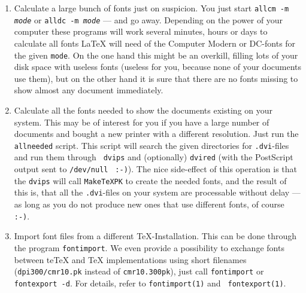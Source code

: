 \documentclass[12pt,a4paper]{article}
\newcommand{\teTeX}{\textrm{te}\TeX\xspace}
\newcommand{\smiley}{\texttt{ :-)}\xspace}
\begin{document}
\begin{enumerate}
  
\item Calculate a large bunch of fonts just on suspicion.
  You just start {\tt allcm -m {\it
      mode}} or {\tt alldc -m {\it mode}} --- and go away.
  Depending on the power of your computer these programs
  will work several minutes, hours or days to calculate all
  fonts \LaTeX{} will need of the Computer Modern or DC-fonts
  for the given {\tt mode}.  On the one hand this might be
  an overkill, filling lots of your disk space with useless
  fonts (useless for you, because none of your documents use
  them), but on the other hand it is sure that there are no
  fonts missing to show almost any document immediately.
  
\item Calculate all the fonts needed to show the documents
  existing on your system. This may be of interest for you
  if you have a large number of documents and bought a new
  printer with a different resolution. Just run the {\tt
    allneeded} script. This script will search the given
  directories for {\tt .dvi}-files and run them through {\tt
    dvips} and (optionally) {\tt dvired} (with the
  PostScript output sent to {\tt /dev/null} \smiley). The
  nice side-effect of this operation is that the {\tt dvips}
  will call {\tt MakeTeXPK} to create the needed fonts, and
  the result of this is, that all the {\tt .dvi}-files on
  your system are processable without delay --- as long as
  you do not produce new ones that use different fonts, of
  course \smiley .
  
\item Import font files from a different \TeX -Installation.  This can
  be done through the program {\tt fontimport}. We even provide a
  possibility to exchange fonts between \teTeX{} and \TeX{}
  implementations using short filenames ({\tt dpi300/cmr10.pk} instead
  of {\tt cmr10.300pk}), just call {\tt fontimport} or {\tt fontexport
    -d}. For details, refer to {\tt fontimport(1)} and {\tt
    fontexport(1)}.
\end{enumerate}


\end{document}
